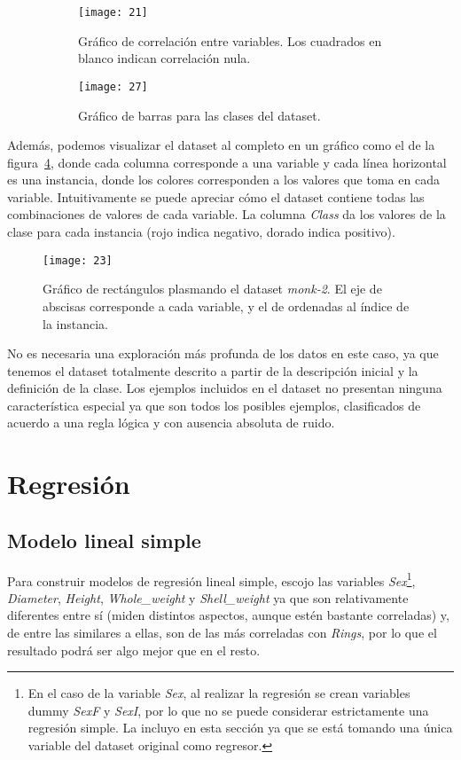 \documentclass[a4paper, 11pt]{article}
\begin{document}
\begin{figure}[ht]
\centering
\begin{subfigure}{.6\textwidth}
  \centering
  \texttt{[image: 21]}
  \caption{\label{fig:monkorr}Gráfico de correlación entre variables. Los cuadrados en blanco indican correlación nula.}
\end{subfigure}%
\hfill
\begin{subfigure}{.35\textwidth}
  \centering
  \texttt{[image: 27]}
  \caption{\label{fig:class}Gráfico de barras para las clases del dataset.}
\end{subfigure}
\caption{}
\end{figure}


Además, podemos visualizar el dataset al completo en un gráfico como el de la figura~\ref{fig:heatmap}, donde cada columna corresponde a una variable y cada línea horizontal es una instancia, donde los colores corresponden a los valores que toma en cada variable. Intuitivamente se puede apreciar cómo el dataset contiene todas las combinaciones de valores de cada variable. La columna \textit{Class} da los valores de la clase para cada instancia (rojo indica negativo, dorado indica positivo).

\begin{figure}[ht]
  \texttt{[image: 23]}
  \caption{\label{fig:heatmap}Gráfico de rectángulos plasmando el dataset \textit{monk-2}. El eje de abscisas corresponde a cada variable, y el de ordenadas al índice de la instancia.}
\end{figure}


No es necesaria una exploración más profunda de los datos en este caso, ya que tenemos el dataset totalmente descrito a partir de la descripción inicial y la definición de la clase. Los ejemplos incluidos en el dataset no presentan ninguna característica especial ya que son todos los posibles ejemplos, clasificados de acuerdo a una regla lógica y con ausencia absoluta de ruido.

\section{Regresión}

\subsection{Modelo lineal simple}

Para construir modelos de regresión lineal simple, escojo las variables \textit{Sex}\footnote{En el caso de la variable \textit{Sex}, al realizar la regresión se crean variables dummy \textit{SexF} y \textit{SexI}, por lo que no se puede considerar estrictamente una regresión simple. La incluyo en esta sección ya que se está tomando una única variable del dataset original como regresor.}, \textit{Diameter}, \textit{Height}, \textit{Whole\_weight} y \textit{Shell\_weight} ya que son relativamente diferentes entre sí (miden distintos aspectos, aunque estén bastante correladas) y, de entre las similares a ellas, son de las más correladas con \textit{Rings}, por lo que el resultado podrá ser algo mejor que en el resto.
\end{document}
